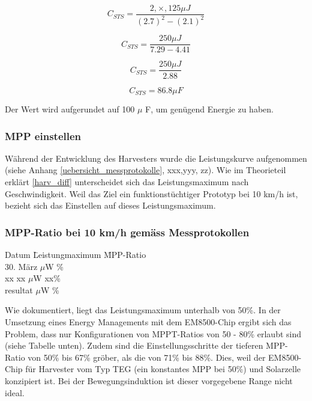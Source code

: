 \begin{equation}
  C_{STS}= \frac{2,\times, 125 \mu J}{(2.7)^2 - (2.1)^2}
\end{equation}

\begin{equation}
  C_{STS}= \frac{ 250 \mu J}{7.29 - 4.41}
\end{equation}

\begin{equation}
  C_{STS}= \frac{ 250 \mu J}{2.88}
\end{equation}

\begin{equation}
  C_{STS}= 86.8 \mu F
\end{equation}

Der Wert wird aufgerundet auf 100 $\mu$ F, um genügend Energie zu haben.

\subsubsection{MPP einstellen}


Während der Entwicklung des Harvesters wurde die Leistungskurve aufgenommen (siehe Anhang \ref{uebersicht_messprotokolle}, xxx,yyy, zz). Wie im Theorieteil erklärt \ref{harv_diff} unterscheidet sich das Leistungsmaximum nach Geschwindigkeit. Weil das Ziel ein funktionstüchtiger Prototyp bei 10 km/h ist, bezieht sich das Einstellen auf dieses Leistungsmaximum.  

 
\subsubsection*{MPP-Ratio bei 10 km/h gemäss Messprotokollen}
\begin{tabbing}
    Datum       \quad\= Leistungmaximum    \quad\= MPP-Ratio\\[0.8ex]
    30. März     $\mu$W        \thinspace\% \\
    xx          \> xx $\mu$W        \> xx\thinspace\%\\
    resultat      $\mu$W    \thinspace\%\\
\end{tabbing}


Wie dokumentiert, liegt das Leistungsmaximum unterhalb von 50\thinspace\%. In der Umsetzung eines Energy Managements mit dem EM8500-Chip ergibt sich das Problem, dass nur Konfigurationen von MPPT-Ratios von 50 - 80\thinspace\% erlaubt sind (siehe Tabelle unten). Zudem sind die Einstellungsschritte der tieferen MPP-Ratio von 50\thinspace\% bis 67\thinspace\% gröber, als die von 71\thinspace\% bis 88\thinspace\%. Dies, weil der EM8500-Chip für Harvester vom Typ TEG (ein konstantes MPP bei 50\thinspace\%) und Solarzelle konzipiert ist. Bei der Bewegungsinduktion ist dieser vorgegebene Range nicht ideal.


